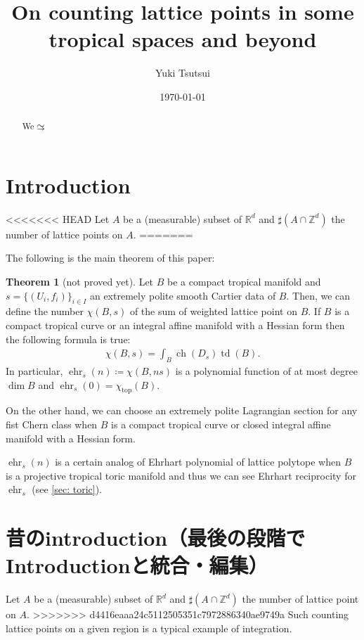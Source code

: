 \documentclass[a4paper,dvipdfmx,reqno,12pt]{amsart}
\title{On counting lattice points in some tropical spaces and beyond
}
\author[Y. Tsutsui]{Yuki Tsutsui}
\date{\today}
\theoremstyle{definition}
\newtheorem{Thm}{Theorem}[section]
\newcommand{\deq}{\coloneqq}
\newcommand{\R}{\mathbb{R}}%
\newcommand{\Z}{\mathbb{Z}}%
\newcommand{\opn}[1]{\operatorname{#1}}
\newcommand{\simto}{ 
\mathrel{\raisebox{0.13em}{${\sim}$}}
\kern -0.75em \mathrel{\raisebox{-0.11em}{${\scriptstyle \to}$}}  
}
\numberwithin{equation}{section}
\begin{document}
\begin{abstract}
  We $\simto$
\end{abstract}
\maketitle

\section{Introduction}
<<<<<<< HEAD
Let $A$ be a (measurable) subset of $\R^{d}$ and $\sharp (A\cap \Z^{d})$ the number of lattice points on $A$.
=======

The following is the main theorem of this paper:

\begin{Thm}[not proved yet]
  Let $B$ be a compact tropical manifold and $s=\{(U_i,f_i)\}_{i\in I}$ an extremely polite smooth Cartier data of $B$.
  Then, we can define the number $\chi(B,s)$ of the sum of
  weighted lattice point on $B$.
  If $B$ is a compact tropical curve or an integral affine manifold with
  a Hessian form then the following formula is true:
  \begin{align}
    \chi(B,s)=\int_{B} \opn{ch}(D_s)\opn{td}(B).
  \end{align}
  In particular, $\opn{ehr}_{s}(n)\deq \chi(B,ns)$ is a polynomial function of at most degree $\opn{dim} B$ and $\opn{ehr}_{s}(0)=\chi_{\opn{top}}(B)$.
\end{Thm}


On the other hand, we can choose an extremely polite Lagrangian section
for any fist Chern class when $B$ is a compact tropical curve or closed integral affine
manifold with a Hessian form.

$\opn{ehr}_{s}(n)$ is a certain analog of Ehrhart polynomial of lattice polytope when $B$ is a projective tropical toric manifold and thus we can see Ehrhart reciprocity for $\opn{ehr}_s$ (see \cref{sec: toric}).

\section{昔のintroduction（最後の段階でIntroductionと統合・編集）}

Let $A$ be a (measurable) subset of $\R^{d}$ and $\sharp (A\cap \Z^{d})$ the number of lattice point on $A$.
>>>>>>> d4416eaaa24c5112505351c7972886340ae9749a
Such counting lattice points on a given region is a typical example of integration.
\end{document}
